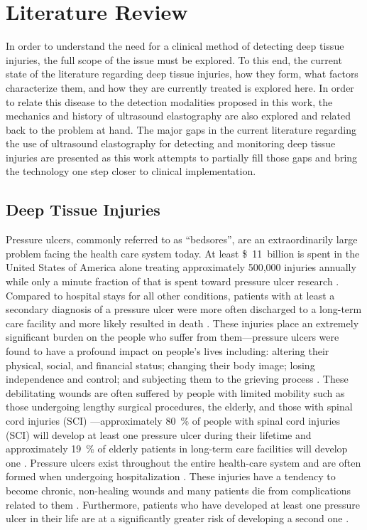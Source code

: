 \chapter{Literature Review}
\label{chap:litreview}
	In order to understand the need for a clinical method of detecting deep tissue injuries, the full scope of the issue must be explored. To this end, the current state of the literature regarding deep tissue injuries, how they form, what factors characterize them, and how they are currently treated is explored here. In order to relate this disease to the detection modalities proposed in this work, the mechanics and history of ultrasound elastography are also explored and related back to the problem at hand. The major gaps in the current literature regarding the use of ultrasound elastography for detecting and monitoring deep tissue injuries are presented as this work attempts to partially fill those gaps and bring the technology one step closer to clinical implementation.

	\section{Deep Tissue Injuries}
		Pressure ulcers, commonly referred to as ``bedsores'', are an extraordinarily large problem facing the health care system today. At least \SI{11}[\$]{billion} is spent in the United States of America alone treating approximately 500,000 injuries annually \cite{beckrich99,russo08} while only a minute fraction of that is spent toward pressure ulcer research \cite{zanca03}. Compared to hospital stays for all other conditions, patients with at least a secondary diagnosis of a pressure ulcer were more often discharged to a long-term care facility and more likely resulted in death \cite{russo08}. These injuries place an extremely significant burden on the people who suffer from them---pressure ulcers were found to have a profound impact on people's lives including: altering their physical, social, and financial status; changing their body image; losing independence and control; and subjecting them to the grieving process \cite{langemo00,baharestani94}. These debilitating wounds are often suffered by people with limited mobility such as those undergoing lengthy surgical procedures, the elderly, and those with spinal cord injuries (SCI) \cite{allman95}---approximately \SI{80}{\percent} of people with spinal cord injuries (SCI) will develop at least one pressure ulcer during their lifetime \cite{salzberg96} and approximately \SI{19}{\percent} of elderly patients in long-term care facilities will develop one \cite{freitas11}. Pressure ulcers exist throughout the entire health-care system and are often formed when undergoing hospitalization \cite{aronovitch99}. These injuries have a tendency to become chronic, non-healing wounds and many patients die from complications related to them \cite{jaul10}. Furthermore, patients who have developed at least one pressure ulcer in their life are at a significantly greater risk of developing a second one \cite{niazi97}. 

